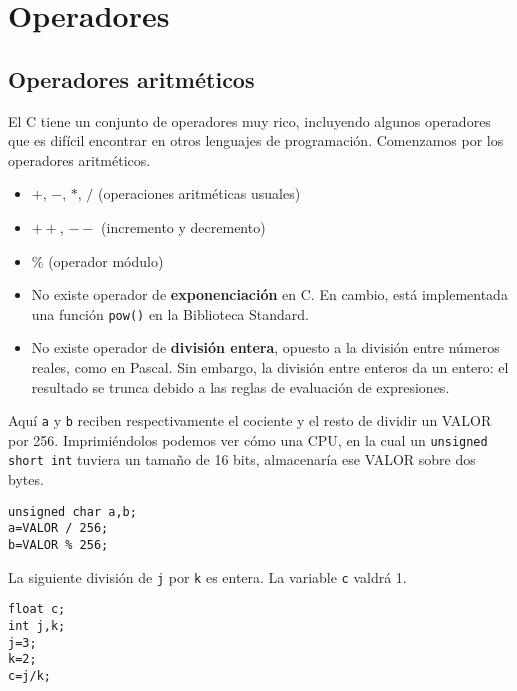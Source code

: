 \chapter{Operadores}
\section{Operadores aritméticos}

El C tiene un conjunto de operadores muy rico, incluyendo algunos operadores que es difícil encontrar en otros lenguajes de programación. Comenzamos por los operadores aritméticos.
\begin{itemize}
	\item $+$, $-$, $*$, $/$ (operaciones aritméticas usuales)
	\item $++$, $--$ (incremento y decremento)
	\item $\%$ (operador módulo)
	\item No existe operador de \textbf{exponenciación} en C. En cambio, está implementada una función \lstinline{pow()} en la Biblioteca Standard.
	\item No existe operador de \textbf{división entera}, opuesto a la división entre números reales, como en Pascal. Sin embargo, la división entre enteros da un entero: el resultado se trunca debido a las reglas de evaluación de expresiones.
\end{itemize}

\begin{ejemplo}
Aquí \lstinline{a} y \lstinline{b} reciben respectivamente el cociente y el resto de dividir un VALOR por 256. Imprimiéndolos podemos ver cómo una CPU, en la cual un \lstinline{unsigned short int} tuviera un tamaño de 16 bits, almacenaría ese VALOR sobre dos bytes.
\begin{lstlisting}
unsigned char a,b;
a=VALOR / 256;
b=VALOR % 256;  	
\end{lstlisting}
\end{ejemplo}  

\begin{ejemplo}
La siguiente división de \lstinline{j} por \lstinline{k} es entera. La variable \lstinline{c} valdrá 1.
\begin{lstlisting}
float c;
int j,k;
j=3; 
k=2;
c=j/k; 
\end{lstlisting}
\end{ejemplo}



